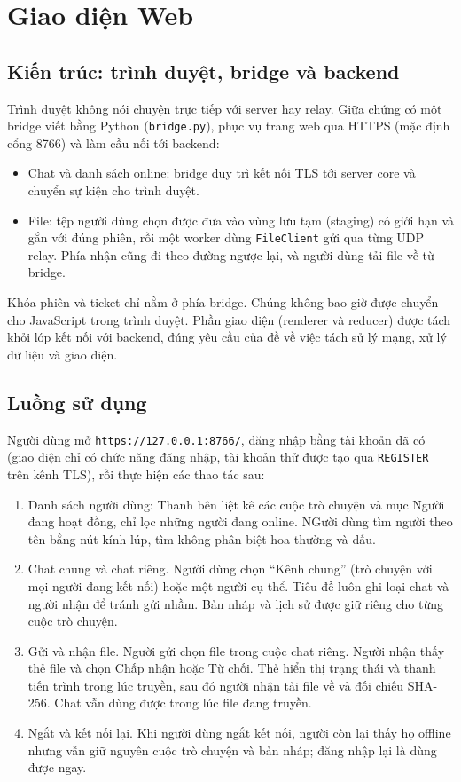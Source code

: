\section{Giao diện Web}

\subsection{Kiến trúc: trình duyệt, bridge và backend}
Trình duyệt không nói chuyện trực tiếp với server hay relay. Giữa chứng có một bridge viết bằng Python (\texttt{bridge.py}), phục vụ trang web qua HTTPS (mặc định cổng 8766) và làm cầu nối tới backend:
\begin{itemize}
    \item Chat và danh sách online: bridge duy trì kết nối TLS tới server core và chuyển sự kiện cho trình duyệt.
    \item File: tệp người dùng chọn được đưa vào vùng lưu tạm (staging) có giới hạn và gắn với đúng phiên, rồi một worker dùng \texttt{FileClient} gửi qua từng UDP relay. Phía nhận cũng đi theo đường ngược lại, và người dùng tải file về từ bridge.
\end{itemize}

Khóa phiên và ticket chỉ nằm ở phía bridge. Chúng không bao giờ được chuyển cho JavaScript trong trình duyệt. Phần giao diện (renderer và reducer) được tách khỏi lớp kết nối với backend, đúng yêu cầu của đề về việc tách sử lý mạng, xử lý dữ liệu và giao diện.

\subsection{Luồng sử dụng}
Người dùng mở \texttt{https://127.0.0.1:8766/}, đăng nhập bằng tài khoản đã có (giao diện chỉ có chức năng đăng nhập, tài khoản thử được tạo qua \texttt{REGISTER} trên kênh TLS), rồi thực hiện các thao tác sau:
\begin{enumerate}
    \item Danh sách người dùng: Thanh bên liệt kê các cuộc trò chuyện và mục Người đang hoạt đồng, chỉ lọc những người đang online. NGười dùng tìm người theo tên bằng nút kính lúp, tìm không phân biệt hoa thường và dấu.
    \item Chat chung và chat riêng. Người dùng chọn “Kênh chung” (trò chuyện với mọi người đang kết nối) hoặc một người cụ thể. Tiêu đề luôn ghi loại chat và người nhận để tránh gửi nhầm. Bản nháp và lịch sử được giữ riêng cho từng cuộc trò chuyện.
    \item Gửi và nhận file. Người gửi chọn file trong cuộc chat riêng. Người nhận thấy thẻ file và chọn Chấp nhận hoặc Từ chối. Thẻ hiển thị trạng thái và thanh tiến trình trong lúc truyền, sau đó người nhận tải file về và đối chiếu SHA-256. Chat vẫn dùng được trong lúc file đang truyền.
    \item Ngắt và kết nối lại. Khi người dùng ngắt kết nối, người còn lại thấy họ offline nhưng vẫn giữ nguyên cuộc trò chuyện và bản nháp; đăng nhập lại là dùng được ngay.
\end{enumerate}

